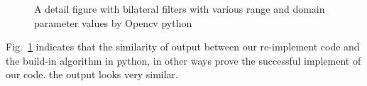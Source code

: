 \documentclass[12pt]{article}
\begin{document}
\begin{figure}[H]
  \quad
  \quad
  \quad
  \caption{A detail figure with bilateral filters with various range and domain parameter values by Opencv python}
  \label{py_cateye}
  \end{figure}
Fig.~\ref{py_cateye} indicates that the similarity of output between our re-implement code and the build-in algorithm in python, in other ways prove the successful implement of our code. the output looks very similar.
\end{document}
